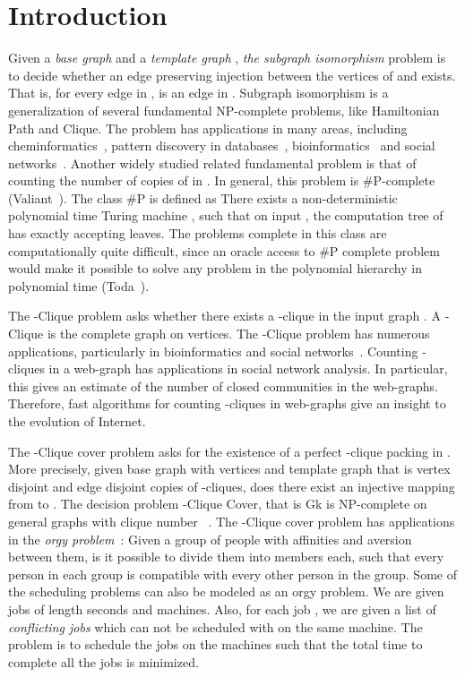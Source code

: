 \documentclass[runningheads,a4paper]{llncs}
\newcounter{obs}
\begin{document}
\section{Introduction}
Given a {\em base graph}  and a {\em template graph} , {\em the subgraph isomorphism} problem is to decide whether an edge preserving injection  between the vertices of  and  exists. 
That is, for every edge  in ,  is an edge in . Subgraph isomorphism is a generalization of several fundamental NP-complete problems, like Hamiltonian Path and Clique. 
The problem has applications in many areas, including cheminformatics~\cite{U76}, pattern discovery in databases~\cite{KK07}, bioinformatics~\cite{PCJ06} and social networks~\cite{SPRH06}. 
Another widely studied related fundamental problem is that of counting the number of copies of  in . In general, this problem is \#P-complete (Valiant~\cite{V79}). The class \#P is defined as  
There exists a non-deterministic polynomial time Turing machine , such that on input , the computation tree of  has exactly  accepting leaves. The problems complete in this class are computationally quite difficult, 
since an oracle access to \#P complete problem would make it possible to solve any problem in the polynomial hierarchy in polynomial time (Toda~\cite{T91}). 

The -Clique problem asks whether there exists a -clique in the input graph . A -Clique is the complete graph on  vertices. The -Clique problem has numerous applications, particularly in bioinformatics and social networks~\cite{PCJ06,SPRH06}. 
Counting -cliques in a web-graph has applications in social network analysis. In particular, this gives an estimate of the number of closed communities in the web-graphs. Therefore, fast algorithms for counting -cliques in web-graphs give an insight to the evolution of Internet. 

The -Clique cover problem asks for the existence of a perfect -clique packing in . More precisely, given base graph  with  vertices and template graph  that is  vertex disjoint and edge disjoint copies of -cliques, does there exist an injective mapping from  to . 
The decision problem -Clique Cover, that is Gk is NP-complete on general graphs with clique number ~\cite{K72}.  The -Clique cover problem has applications in the {\em orgy problem}~\cite{CHW82}:
 Given a group of people with affinities and aversion between them, is it possible to divide them into   members each, such that every person in each group is compatible with every other person in the group. 
Some of the scheduling problems can also be modeled as an orgy problem. 
We are given  jobs of length  seconds and  machines. Also, for each job , we are given a list of {\em conflicting jobs} which can not be scheduled with  on the same machine. The problem is to schedule the jobs on the machines such that the total time to complete all the jobs is minimized. 
\end{document}
